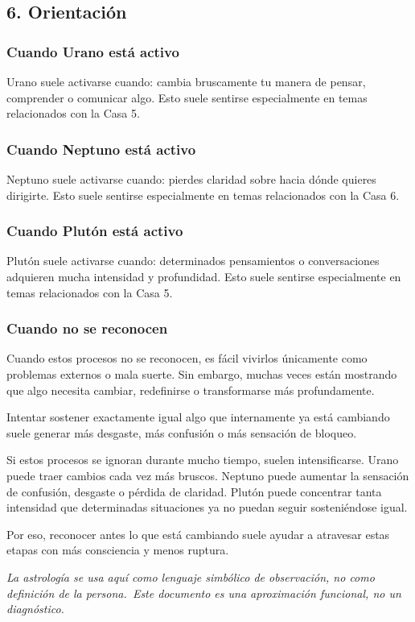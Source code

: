 \documentclass[11pt,a4paper]{article}
\begin{document}
\vspace{0.8cm}

\subsection{6. Orientación}

\subsubsection*{Cuando Urano está activo}
Urano suele activarse cuando: cambia bruscamente tu manera de pensar, comprender o comunicar algo. Esto suele sentirse especialmente en temas relacionados con la Casa 5.

\subsubsection*{Cuando Neptuno está activo}
Neptuno suele activarse cuando: pierdes claridad sobre hacia dónde quieres dirigirte. Esto suele sentirse especialmente en temas relacionados con la Casa 6.

\subsubsection*{Cuando Plutón está activo}
Plutón suele activarse cuando: determinados pensamientos o conversaciones adquieren mucha intensidad y profundidad. Esto suele sentirse especialmente en temas relacionados con la Casa 5.

\subsubsection*{Cuando no se reconocen}
Cuando estos procesos no se reconocen, es fácil vivirlos únicamente como problemas externos o mala suerte. Sin embargo, muchas veces están mostrando que algo necesita cambiar, redefinirse o transformarse más profundamente.

Intentar sostener exactamente igual algo que internamente ya está cambiando suele generar más desgaste, más confusión o más sensación de bloqueo.

\vspace{0.6cm}
Si estos procesos se ignoran durante mucho tiempo, suelen intensificarse. Urano puede traer cambios cada vez más bruscos. Neptuno puede aumentar la sensación de confusión, desgaste o pérdida de claridad. Plutón puede concentrar tanta intensidad que determinadas situaciones ya no puedan seguir sosteniéndose igual.

Por eso, reconocer antes lo que está cambiando suele ayudar a atravesar estas etapas con más consciencia y menos ruptura.

\vspace{1cm}
\begin{center}
{\small\itshape\color{grisai}
La astrología se usa aquí como lenguaje simbólico de observación, no como definición de la persona.\
Este documento es una aproximación funcional, no un diagnóstico.
}
\end{center}
\end{document}
